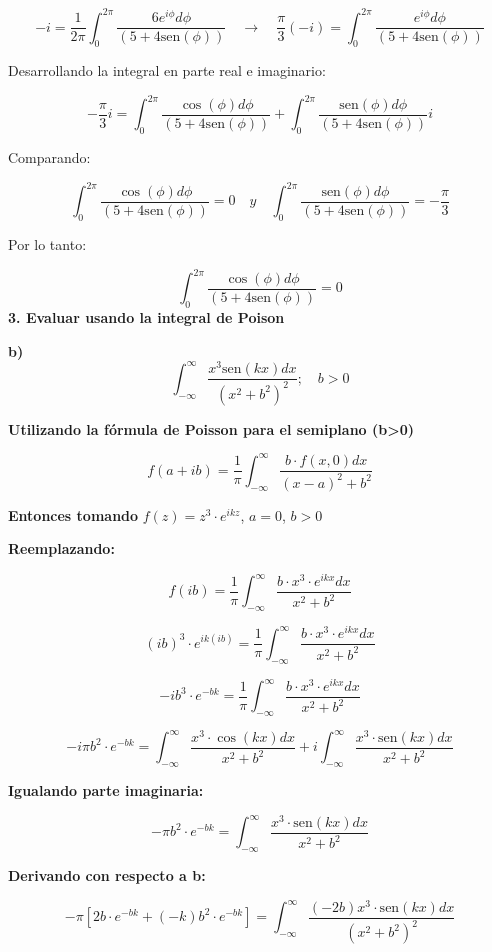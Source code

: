 \documentclass[a4paper,12pt]{article}
\begin{document}
\[
-i = \frac{1}{2\pi} \int_{0}^{2\pi} \frac{6e^{i\phi} d\phi}{(5 + 4\text{sen}(\phi))} \quad \rightarrow \quad \frac{\pi}{3}(-i) = \int_{0}^{2\pi} \frac{e^{i\phi} d\phi}{(5 + 4\text{sen}(\phi))}
\]

Desarrollando la integral en parte real e imaginario:

\[
-\frac{\pi}{3}i = \int_{0}^{2\pi} \frac{\cos(\phi) d\phi}{(5 + 4\text{sen}(\phi))} + \int_{0}^{2\pi} \frac{\text{sen}(\phi) d\phi}{(5 + 4\text{sen}(\phi))} i
\]

Comparando:

\[
\int_{0}^{2\pi} \frac{\cos(\phi) d\phi}{(5 + 4\text{sen}(\phi))} = 0 \quad y \quad \int_{0}^{2\pi} \frac{\text{sen}(\phi) d\phi}{(5 + 4\text{sen}(\phi))} = -\frac{\pi}{3}
\]

Por lo tanto:

\[
\int_{0}^{2\pi} \frac{\cos(\phi) d\phi}{(5 + 4\text{sen}(\phi))} = 0
\]
\textbf{3. Evaluar usando la integral de Poison}

\textbf{b)}
\[
\int_{-\infty}^{\infty} \frac{x^3 \text{sen}(kx) dx}{(x^2 + b^2)^2}; \quad b > 0
\]

\textbf{Utilizando la fórmula de Poisson para el semiplano (b>0)}

\[
f(a + ib) = \frac{1}{\pi} \int_{-\infty}^{\infty} \frac{b \cdot f(x, 0) dx}{(x - a)^2 + b^2}
\]

\textbf{Entonces tomando} $f(z) = z^3 \cdot e^{ikz}$, $a = 0$, $b > 0$

\textbf{Reemplazando:}

\[
f(ib) = \frac{1}{\pi} \int_{-\infty}^{\infty} \frac{b \cdot x^3 \cdot e^{ikx} dx}{x^2 + b^2}
\]

\[
(ib)^3 \cdot e^{ik(ib)} = \frac{1}{\pi} \int_{-\infty}^{\infty} \frac{b \cdot x^3 \cdot e^{ikx} dx}{x^2 + b^2}
\]

\[
-ib^3 \cdot e^{-bk} = \frac{1}{\pi} \int_{-\infty}^{\infty} \frac{b \cdot x^3 \cdot e^{ikx} dx}{x^2 + b^2}
\]

\[
-i\pi b^2 \cdot e^{-bk} = \int_{-\infty}^{\infty} \frac{x^3 \cdot \cos(kx) dx}{x^2 + b^2} + i \int_{-\infty}^{\infty} \frac{x^3 \cdot \text{sen}(kx) dx}{x^2 + b^2}
\]

\textbf{Igualando parte imaginaria:}

\[
-\pi b^2 \cdot e^{-bk} = \int_{-\infty}^{\infty} \frac{x^3 \cdot \text{sen}(kx) dx}{x^2 + b^2}
\]

\textbf{Derivando con respecto a b:}

\[
-\pi [2b \cdot e^{-bk} + (-k)b^2 \cdot e^{-bk}] = \int_{-\infty}^{\infty} \frac{(-2b)x^3 \cdot \text{sen}(kx) dx}{(x^2 + b^2)^2}
\]
\end{document}
